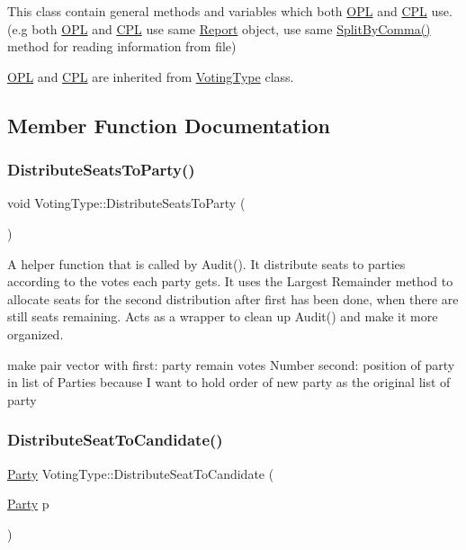 This class contain general methods and variables which both \hyperlink{classOPL}{O\+PL} and \hyperlink{classCPL}{C\+PL} use. (e.\+g both \hyperlink{classOPL}{O\+PL} and \hyperlink{classCPL}{C\+PL} use same \hyperlink{classReport}{Report} object, use same \hyperlink{classVotingType_afd3cf8ddedcf5d5aae86b86eb8d3bdd0}{Split\+By\+Comma()} method for reading information from file)

\hyperlink{classOPL}{O\+PL} and \hyperlink{classCPL}{C\+PL} are inherited from \hyperlink{classVotingType}{Voting\+Type} class. 

\subsection{Member Function Documentation}
\mbox{\label{classVotingType_a38b581488ff63dde73225360b56161dc}} 
\subsubsection{\texorpdfstring{Distribute\+Seats\+To\+Party()}{DistributeSeatsToParty()}}
{\footnotesize\ttfamily void Voting\+Type\+::\+Distribute\+Seats\+To\+Party (\begin{DoxyParamCaption}{ }\end{DoxyParamCaption})}



A helper function that is called by Audit(). It distribute seats to parties according to the votes each party gets. It uses the Largest Remainder method to allocate seats for the second distribution after first has been done, when there are still seats remaining. Acts as a wrapper to clean up Audit() and make it more organized. 

make pair vector with first\+: party remain votes Number second\+: position of party in list of Parties because I want to hold order of new party as the original list of party\mbox{\label{classVotingType_a7752ec81cc1d302587fa1cba66bd12e4}} 
\subsubsection{\texorpdfstring{Distribute\+Seat\+To\+Candidate()}{DistributeSeatToCandidate()}}
{\footnotesize\ttfamily \hyperlink{classParty}{Party} Voting\+Type\+::\+Distribute\+Seat\+To\+Candidate (\begin{DoxyParamCaption}\item[{\hyperlink{classParty}{Party}}]{p }\end{DoxyParamCaption})}



